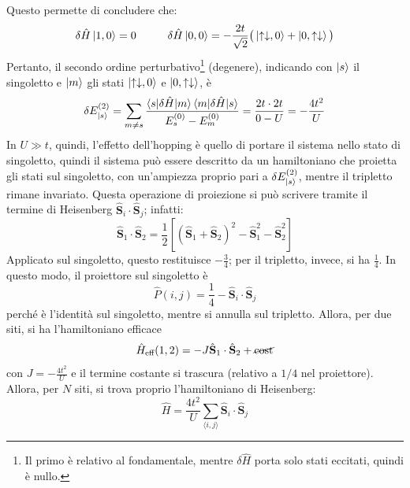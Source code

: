 \documentclass[11pt, a4paper]{scrartcl}
\theoremstyle{style}
\theoremstyle{style1}
\numberwithin{equation}{subsection}
\begin{document}
Questo permette di concludere che:
\[
\delta \hat{H} \ket{1,0} =0 \hspace{1cm}\delta \hat{H}\ket{0,0} = -\frac{2t}{\sqrt{2} } \big(\ket{\uparrow\downarrow,0} + \ket{0,\uparrow\downarrow} \big) 
\] 
Pertanto, il secondo ordine perturbativo\footnote{Il primo \`e relativo al fondamentale, mentre $\delta \hat{H}$ porta solo stati eccitati, quindi \`e nullo.} (degenere), indicando con $\ket{s} $ il singoletto e $\ket{m} $ gli stati $\ket{\uparrow\downarrow,0} $ e $\ket{0,\uparrow\downarrow} $, \`e 
\[
\delta E^{(2)}_{\ket{s} } = \sum_{m\neq s}^{} \frac{\braket{s|\delta \hat{H}|m} \braket{m|\delta \hat{H}|s} }{E_s^{(0)}- E_m^{(0)}} = \frac{2t \cdot 2t}{0 - U}= - \frac{4t^2}{U}
\] 
In $U\gg t$, quindi, l'effetto dell'hopping \`e quello di portare il sistema nello stato di singoletto, quindi il sistema pu\`o essere descritto da un hamiltoniano che proietta gli stati sul singoletto, con un'ampiezza proprio pari a $\delta E^{(2)}_{\ket{s} } $, mentre il tripletto rimane invariato.
Questa operazione di proiezione si pu\`o scrivere tramite il termine di Heisenberg $\hat{\mathbf{S} }_i \cdot \hat{\mathbf{S} }_j$; infatti:
\[
\hat{\mathbf{S} }_1 \cdot \hat{\mathbf{S} }_2 = \frac{1}{2}\left[ \left(\hat{\mathbf{S} }_1 + \hat{\mathbf{S} }_2\right) ^2 - \hat{\mathbf{S} }_1 ^2 - \hat{\mathbf{S} }_2 ^2 \right]
\] 
Applicato sul singoletto, questo restituisce $-\frac{3}{4}$; per il tripletto, invece, si ha $\frac{1}{4}$.
In questo modo, il proiettore sul singoletto \`e 
\[
\hat{P}(i,j) = \frac{1}{4} - \hat{\mathbf{S} }_i \cdot \hat{\mathbf{S} }_j
\] 
perch\'e \`e l'identit\`a sul singoletto, mentre si annulla sul tripletto.
Allora, per due siti, si ha l'hamiltoniano efficace
\[
	\hat{H}_\text{eff} (1,2) = - J \hat{\mathbf{S} }_1 \cdot \hat{\mathbf{S} }_2 + \cancel{\text{cost}} 
\] 
con $J = -\frac{4t^2}{U}$ e il termine costante si trascura (relativo a $1 / 4 $ nel proiettore).
Allora, per $N$ siti, si trova proprio l'hamiltoniano di Heisenberg:
\[
\hat{H} = \frac{4t^2}{U}\sum_{\langle i,j \rangle}^{} \hat{\mathbf{S} }_i \cdot \hat{\mathbf{S} }_j
\] 
\end{document}
